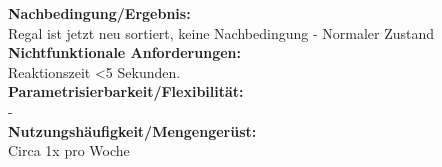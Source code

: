 \textbf{Nachbedingung/Ergebnis:}\\
Regal ist jetzt neu sortiert, keine Nachbedingung - Normaler Zustand\\
\textbf{Nichtfunktionale Anforderungen:}\\
Reaktionszeit \textless 5 Sekunden.\\
\textbf{Parametrisierbarkeit/Flexibilität:}\\
-\\
\textbf{Nutzungshäufigkeit/Mengengerüst:}\\
Circa 1x pro Woche\\
